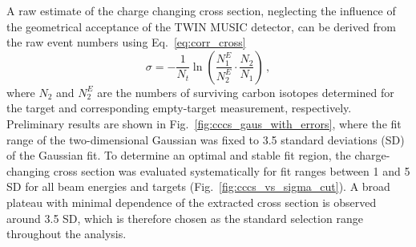 A raw estimate of the charge changing cross section, neglecting the influence of the geometrical acceptance of the TWIN MUSIC detector, can be derived from the raw event numbers using Eq.~\ref{eq:corr_cross}
\begin{equation}\label{eq:cs_cc_show}
    \sigma = -\frac{1}{N_t} \ln\left(\frac{N_1^E}{N_2^E} \cdot \frac{N_2}{N_1}\right) \, ,
\end{equation}
where $N_2$ and $N_2^E$ are the numbers of surviving carbon isotopes determined for the target and corresponding empty-target measurement, respectively.\\
Preliminary results are shown in Fig.~\ref{fig:cccs_gaus_with_errors}, where the fit range of the two-dimensional Gaussian was fixed to 3.5 standard deviations (SD) of the Gaussian fit. To determine an optimal and stable fit region, the charge-changing cross section was evaluated systematically for fit ranges between 1 and 5 SD for all beam energies and targets (Fig.~\ref{fig:cccs_vs_sigma_cut}). A broad plateau with minimal dependence of the extracted cross section is observed around 3.5 SD, which is therefore chosen as the standard selection range throughout the analysis.
%
